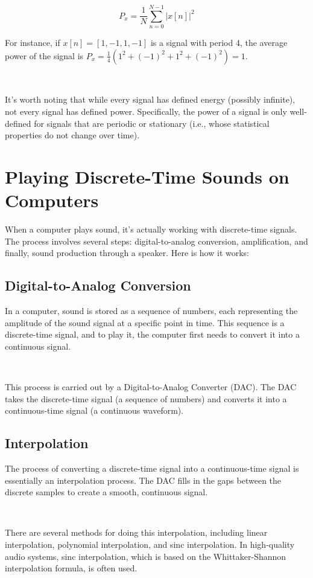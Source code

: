 \documentclass[11pt]{article}
\begin{document}
\[
P_x = \frac{1}{N}\sum_{n=0}^{N-1} |x[n]|^2
\]

For instance, if $x[n] = [1, -1, 1, -1]$ is a signal with period 4, the average power of the signal is $P_x = \frac{1}{4}(1^2 + (-1)^2 + 1^2 + (-1)^2) = 1$.

\ 


It's worth noting that while every signal has defined energy (possibly infinite), not every signal has defined power. Specifically, the power of a signal is only well-defined for signals that are periodic or stationary (i.e., whose statistical properties do not change over time).

\section*{Playing Discrete-Time Sounds on Computers}

When a computer plays sound, it's actually working with discrete-time signals. The process involves several steps: digital-to-analog conversion, amplification, and finally, sound production through a speaker. Here is how it works:

\subsection*{Digital-to-Analog Conversion}

In a computer, sound is stored as a sequence of numbers, each representing the amplitude of the sound signal at a specific point in time. This sequence is a discrete-time signal, and to play it, the computer first needs to convert it into a continuous signal.

\ 


This process is carried out by a Digital-to-Analog Converter (DAC). The DAC takes the discrete-time signal (a sequence of numbers) and converts it into a continuous-time signal (a continuous waveform).

\subsection*{Interpolation}

The process of converting a discrete-time signal into a continuous-time signal is essentially an interpolation process. The DAC fills in the gaps between the discrete samples to create a smooth, continuous signal.

\ 


There are several methods for doing this interpolation, including linear interpolation, polynomial interpolation, and sinc interpolation. In high-quality audio systems, sinc interpolation, which is based on the Whittaker-Shannon interpolation formula, is often used.
\end{document}
